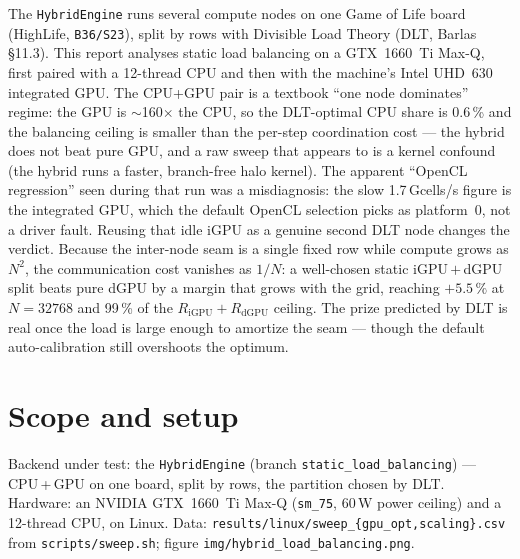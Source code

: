 \documentclass[
	english,
	letterpaper, oneside
]{article}
\begin{document}
\templatePortrait

\templatePagecfg

\begin{abstractd}
	The \texttt{HybridEngine} runs several compute nodes on one Game of Life board
	(HighLife, \texttt{B36/S23}), split by rows with Divisible Load Theory (DLT, Barlas
	\S11.3). This report analyses static load balancing on a GTX~1660~Ti Max-Q, first
	paired with a 12-thread CPU and then with the machine's Intel UHD~630 integrated GPU.
	The CPU+GPU pair is a textbook ``one node dominates'' regime: the GPU is
	$\sim$160$\times$ the CPU, so the DLT-optimal CPU share is 0.6\,\% and the balancing
	ceiling is smaller than the per-step coordination cost --- the hybrid does not beat
	pure GPU, and a raw sweep that appears to is a kernel confound (the hybrid runs a
	faster, branch-free halo kernel). The apparent ``OpenCL regression'' seen during that
	run was a misdiagnosis: the slow 1.7\,Gcells/s figure is the integrated GPU, which the
	default OpenCL selection picks as platform~0, not a driver fault. Reusing that idle
	iGPU as a genuine second DLT node changes the verdict. Because the inter-node seam is
	a single fixed row while compute grows as $N^2$, the communication cost vanishes as
	$1/N$: a well-chosen static iGPU\,$+$\,dGPU split beats pure dGPU by a margin that
	grows with the grid, reaching $+5.5\,\%$ at $N=32768$ and 99\,\% of the
	$R_\text{iGPU}+R_\text{dGPU}$ ceiling. The prize predicted by DLT is real once the
	load is large enough to amortize the seam --- though the default auto-calibration
	still overshoots the optimum.
\end{abstractd}

\templateIndex

\templateFinalcfg


\section{Scope and setup}
\label{sec:setup}

Backend under test: the \texttt{HybridEngine} (branch
\texttt{static\_load\_balancing}) --- CPU\,+\,GPU on one board, split by rows, the
partition chosen by DLT. Hardware: an NVIDIA GTX~1660~Ti Max-Q (\texttt{sm\_75},
60\,W power ceiling) and a 12-thread CPU, on Linux. Data:
\texttt{results/linux/sweep\_\{gpu\_opt,scaling\}.csv} from \texttt{scripts/sweep.sh};
figure \texttt{img/hybrid\_load\_balancing.png}.
\end{document}
